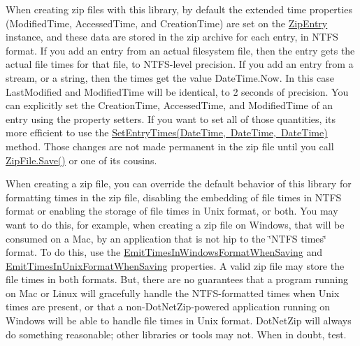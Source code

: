 When creating zip files with this library, by default the extended time properties ({\ttfamily Modified\+Time}, {\ttfamily Accessed\+Time}, and {\ttfamily Creation\+Time}) are set on the \mbox{\hyperlink{class_super_tiled2_unity_1_1_ionic_1_1_zip_1_1_zip_entry}{Zip\+Entry}} instance, and these data are stored in the zip archive for each entry, in N\+T\+FS format. If you add an entry from an actual filesystem file, then the entry gets the actual file times for that file, to N\+T\+F\+S-\/level precision. If you add an entry from a stream, or a string, then the times get the value {\ttfamily Date\+Time.\+Now}. In this case {\ttfamily Last\+Modified} and {\ttfamily Modified\+Time} will be identical, to 2 seconds of precision. You can explicitly set the {\ttfamily Creation\+Time}, {\ttfamily Accessed\+Time}, and {\ttfamily Modified\+Time} of an entry using the property setters. If you want to set all of those quantities, it\textquotesingle{}s more efficient to use the \mbox{\hyperlink{class_super_tiled2_unity_1_1_ionic_1_1_zip_1_1_zip_entry_a7331ca69b05c476a9d321b30d7649766}{Set\+Entry\+Times(\+Date\+Time, Date\+Time, Date\+Time)}} method. Those changes are not made permanent in the zip file until you call \mbox{\hyperlink{class_super_tiled2_unity_1_1_ionic_1_1_zip_1_1_zip_file_aff8f1b3d07b66481e2629b04017a056f}{Zip\+File.\+Save()}} or one of its cousins. 

When creating a zip file, you can override the default behavior of this library for formatting times in the zip file, disabling the embedding of file times in N\+T\+FS format or enabling the storage of file times in Unix format, or both. You may want to do this, for example, when creating a zip file on Windows, that will be consumed on a Mac, by an application that is not hip to the \char`\"{}\+N\+T\+F\+S times\char`\"{} format. To do this, use the \mbox{\hyperlink{class_super_tiled2_unity_1_1_ionic_1_1_zip_1_1_zip_entry_affabc22ba72be27e9134676becddcec7}{Emit\+Times\+In\+Windows\+Format\+When\+Saving}} and \mbox{\hyperlink{class_super_tiled2_unity_1_1_ionic_1_1_zip_1_1_zip_entry_afd50bda347e67681780f32ebdba43f58}{Emit\+Times\+In\+Unix\+Format\+When\+Saving}} properties. A valid zip file may store the file times in both formats. But, there are no guarantees that a program running on Mac or Linux will gracefully handle the N\+T\+F\+S-\/formatted times when Unix times are present, or that a non-\/\+Dot\+Net\+Zip-\/powered application running on Windows will be able to handle file times in Unix format. Dot\+Net\+Zip will always do something reasonable; other libraries or tools may not. When in doubt, test. 

